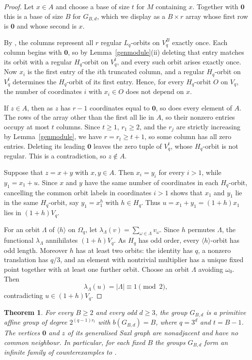 \documentclass[a4paper,reqno,11pt]{amsart}
\newtheorem{thm}{Theorem}[section]
\numberwithin{equation}{section}
\begin{document}
\begin{proof}
Let $x\in A$ and choose a base of size $t$ for $M$ containing $x$. Together with $\mathbf0$ this is a base of size $B$ for $G_{B,d}$, which we display as a $B\times r$ array whose first row is $\mathbf0$ and whose second is $x$.

By \cite[Lemma~6.2]{FHLR}, the columns represent all $r$ regular $L_q$-orbits on $V_q^B$ exactly once. Each column begins with $\mathbf0$, so by Lemma~\ref{genmodule}(ii) deleting that entry matches its orbit with a regular $H_q$-orbit on $V_q^t$, and every such orbit arises exactly once. Now $x_i$ is the first entry of the $i$th truncated column, and a regular $H_q$-orbit on $V_q^t$ determines the $H_q$-orbit of its first entry. Hence, for every $H_q$-orbit $O$ on $V_q$, the number of coordinates $i$ with $x_i\in O$ does not depend on $x$.

If $z\in A$, then as $z$ has $r-1$ coordinates equal to $\mathbf0$, so does every element of $A$. The rows of the array other than the first all lie in $A$, so their nonzero entries occupy at most $t$ columns. Since $t\ge1$, $r_1\ge2$, and the $r_j$ are strictly increasing by Lemma~\ref{genmodule}, we have $r=r_t\ge t+1$, so some column has all zero entries. Deleting its leading $\mathbf0$ leaves the zero tuple of $V_q^t$, whose $H_q$-orbit is not regular. This is a contradiction, so $z\notin A$.

Suppose that $z=x+y$ with $x,y\in A$. Then $x_i=y_i$ for every $i>1$, while $y_1=x_1+u$. Since $x$ and $y$ have the same number of coordinates in each $H_q$-orbit, cancelling the common orbit labels in coordinates $i>1$ shows that $x_1$ and $y_1$ lie in the same $H_q$-orbit, say $y_1=x_1^h$ with $h\in H_q$. Thus $u=x_1+y_1=(1+h)x_1$ lies in $(1+h)V_q$.

For an orbit $\Lambda$ of $\langle h\rangle$ on $\Omega_q$, let $\lambda_\Lambda(v)=\sum_{\omega\in\Lambda}v_\omega$. Since $h$ permutes $\Lambda$, the functional $\lambda_\Lambda$ annihilates $(1+h)V_q$. As $H_q$ has odd order, every $\langle h\rangle$-orbit has odd length. Moreover $h$ has at least two orbits: the identity has $q$, a nonzero translation has $q/3$, and an element with nontrivial multiplier has a unique fixed point together with at least one further orbit. Choose an orbit $\Lambda$ avoiding $\omega_0$. Then
\[
\lambda_\Lambda(u)=|\Lambda|\equiv1\pmod2,
\]
contradicting $u\in(1+h)V_q$.
\end{proof}



\begin{thm}\label{genthm}
For every $B\ge2$ and every odd $d\ge3$, the group $G_{B,d}$ is a primitive affine group of degree $2^{(q-1)r_t}$ with $b(G_{B,d})=B$, where $q=3^d$ and $t=B-1$. The vertices $\mathbf0$ and $z$ of its generalised Saxl graph are nonadjacent and have no common neighbour. In particular, for each fixed $B$ the groups $G_{B,d}$ form an infinite family of counterexamples to \cite[Conjecture~1.2]{FHLR}.
\end{thm}
\end{document}
